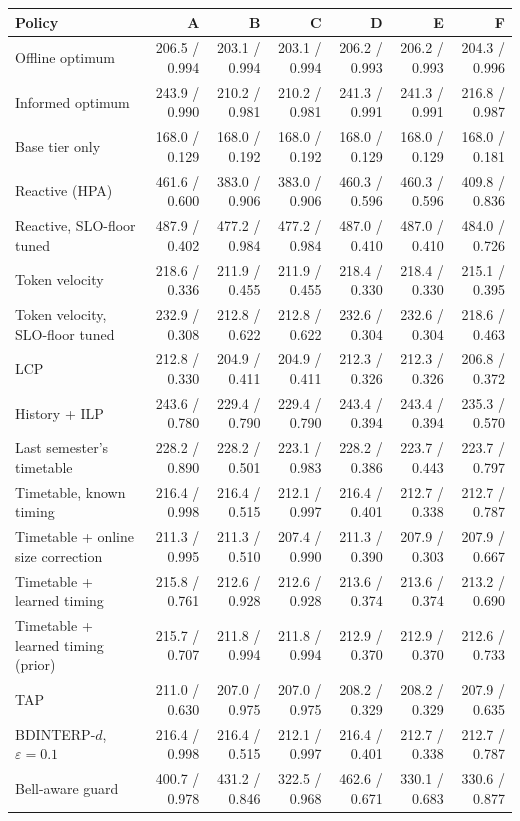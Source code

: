 \begin{tabular}{@{}lrrrrrr@{}}
\toprule
Policy & A & B & C & D & E & F \\
\midrule
Offline optimum & 206.5 / 0.994 & 203.1 / 0.994 & 203.1 / 0.994 & 206.2 / 0.993 & 206.2 / 0.993 & 204.3 / 0.996 \\
Informed optimum & 243.9 / 0.990 & 210.2 / 0.981 & 210.2 / 0.981 & 241.3 / 0.991 & 241.3 / 0.991 & 216.8 / 0.987 \\
Base tier only & 168.0 / 0.129 & 168.0 / 0.192 & 168.0 / 0.192 & 168.0 / 0.129 & 168.0 / 0.129 & 168.0 / 0.181 \\
Reactive (HPA) & 461.6 / 0.600 & 383.0 / 0.906 & 383.0 / 0.906 & 460.3 / 0.596 & 460.3 / 0.596 & 409.8 / 0.836 \\
Reactive, SLO-floor tuned & 487.9 / 0.402 & 477.2 / 0.984 & 477.2 / 0.984 & 487.0 / 0.410 & 487.0 / 0.410 & 484.0 / 0.726 \\
Token velocity & 218.6 / 0.336 & 211.9 / 0.455 & 211.9 / 0.455 & 218.4 / 0.330 & 218.4 / 0.330 & 215.1 / 0.395 \\
Token velocity, SLO-floor tuned & 232.9 / 0.308 & 212.8 / 0.622 & 212.8 / 0.622 & 232.6 / 0.304 & 232.6 / 0.304 & 218.6 / 0.463 \\
LCP & 212.8 / 0.330 & 204.9 / 0.411 & 204.9 / 0.411 & 212.3 / 0.326 & 212.3 / 0.326 & 206.8 / 0.372 \\
History + ILP & 243.6 / 0.780 & 229.4 / 0.790 & 229.4 / 0.790 & 243.4 / 0.394 & 243.4 / 0.394 & 235.3 / 0.570 \\
Last semester's timetable & 228.2 / 0.890 & 228.2 / 0.501 & 223.1 / 0.983 & 228.2 / 0.386 & 223.7 / 0.443 & 223.7 / 0.797 \\
Timetable, known timing & 216.4 / 0.998 & 216.4 / 0.515 & 212.1 / 0.997 & 216.4 / 0.401 & 212.7 / 0.338 & 212.7 / 0.787 \\
Timetable + online size correction & 211.3 / 0.995 & 211.3 / 0.510 & 207.4 / 0.990 & 211.3 / 0.390 & 207.9 / 0.303 & 207.9 / 0.667 \\
Timetable + learned timing & 215.8 / 0.761 & 212.6 / 0.928 & 212.6 / 0.928 & 213.6 / 0.374 & 213.6 / 0.374 & 213.2 / 0.690 \\
Timetable + learned timing (prior) & 215.7 / 0.707 & 211.8 / 0.994 & 211.8 / 0.994 & 212.9 / 0.370 & 212.9 / 0.370 & 212.6 / 0.733 \\
TAP & 211.0 / 0.630 & 207.0 / 0.975 & 207.0 / 0.975 & 208.2 / 0.329 & 208.2 / 0.329 & 207.9 / 0.635 \\
BDINTERP-$d$, $\varepsilon=0.1$ & 216.4 / 0.998 & 216.4 / 0.515 & 212.1 / 0.997 & 216.4 / 0.401 & 212.7 / 0.338 & 212.7 / 0.787 \\
Bell-aware guard & 400.7 / 0.978 & 431.2 / 0.846 & 322.5 / 0.968 & 462.6 / 0.671 & 330.1 / 0.683 & 330.6 / 0.877 \\
\bottomrule
\end{tabular}
